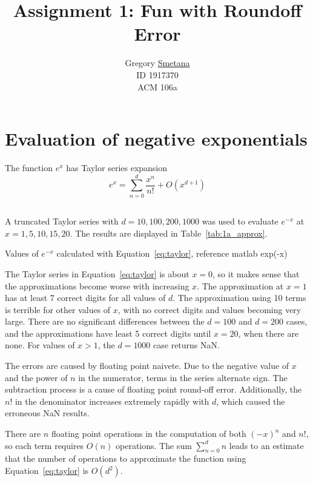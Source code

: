 \documentclass[11pt]{article} %
\title{Assignment 1: Fun with Roundoff Error}
\author{ Gregory \uline{Smetana} \\ID 1917370 \\ ACM 106a }
\begin{document}
\maketitle

\section{Evaluation of negative exponentials }

The function $e^x$ has Taylor series expansion
\begin{equation}
	e^x = \sum_{n=0}^{d} \frac{x^n}{n!} + O(x^{d+1})
	\label{eq:taylor}
\end{equation}

\subsection{} %

A truncated Taylor series with $d = 10, 100, 200, 1000$ was used to evaluate $e^{-x}$ at $x =
1, 5, 10, 15, 20$. The results are displayed in Table~\ref{tab:1a_approx}.

\begin{table}[h!]
\centering


\caption{Values of $e^{-x}$ calculated with Equation~\ref{eq:taylor}, reference matlab exp(-x)}
\label{tab:1a_approx}
\end{table}

The Taylor series in Equation~\ref{eq:taylor} is about $x=0$, so it makes sense that the approximations become worse with increasing $x$. The approximation at $x=1$ has at least 7 correct digits for all values of $d$. The  approximation using 10 terms is terrible for other values of $x$, with no correct digits and values becoming very large. There are no significant differences between the $d=100$ and $d=200$ cases, and the approximations have least 5 correct digits until $x=20$, when there are none. For values of $x > 1$, the $d=1000$ case returns NaN.

The errors are caused by floating point naivete. Due to the negative value of $x$ and the power of $n$ in the numerator, terms in the series alternate sign. The subtraction process is a cause of floating point round-off error. Additionally, the $n!$ in the denominator increases extremely rapidly with $d$, which caused the erroneous NaN results.

There are $n$ floating point operations in the computation of both $(-x)^n$ and $n!$, so each term requires $O(n)$ operations. The sum $\sum_{n=0}^d n$ leads to an estimate that the number of operations to approximate the function using Equation~\ref{eq:taylor} is $O(d^2)$.
\end{document}
